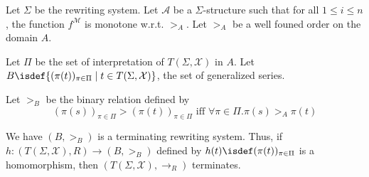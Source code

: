     \begin{definition}
        Let $\Sigma$ be the rewriting system. 
        Let $\mathcal{A}$ be a $\Sigma$-structure such that for all $1 \leq i \leq n$, the function $f^\mathcal{M}$ is monotone w.r.t. $>_A$. Let $>_A$ be a well founed order on the domain $A$.

        Let $\Pi$ be the set of interpretation of $T(\Sigma,\mathcal{X})$ in $A$.
        Let $B\isdef \{(\pi(t))_{\pi\in \Pi} \mid t \in T(\Sigma,\mathcal{X})\}$, the set of generalized series. 

        Let $>_B$ be the binary relation defined by 
        $$(\pi(s))_{\pi\in \Pi} > (\pi(t))_{\pi\in \Pi} \text{ iff } \forall \pi \in \Pi. \pi(s) >_A \pi(t)$$


        We have $(B, >_B)$ is a terminating rewriting system. Thus, if $h:(T(\Sigma,\mathcal{X}),R) \to (B,>_B)$ defined by $h(t) \isdef (\pi(t))_{\pi\in \Pi}$ is a homomorphism, then $(T(\Sigma,\mathcal{X}), \to_R)$ terminates.
    \end{definition}